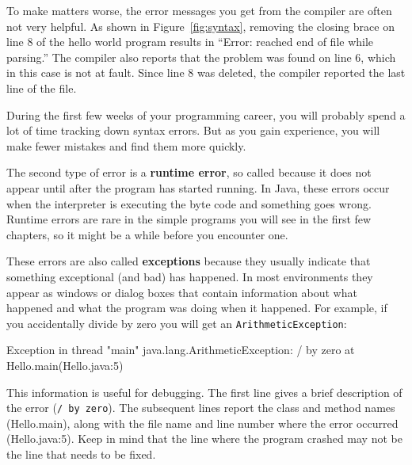 \documentclass[12pt]{book}
\makeatletter
\theoremstyle{exercise}
\newcommand{\java}[1]{\verb"#1"}
\renewcommand\subsection{\@startsection{subsection}{2}{\z@}%
    {-3.25ex\@plus -1ex \@minus -.2ex}%
    {0.3ex \@plus .2ex}%
    {\normalfont\large\bfseries}}
\newcommand{\java}[1]{\lstinline{#1}} %
\makeatother
\begin{document}
To make matters worse, the error messages you get from the compiler are often not very helpful.
As shown in Figure~\ref{fig:syntax}, removing the closing brace on line 8 of the hello world program results in ``Error: reached end of file while parsing.''
The compiler also reports that the problem was found on line 6, which in this case is not at fault.
Since line 8 was deleted, the compiler reported the last line of the file.

During the first few weeks of your programming career, you will probably spend a lot of time tracking down syntax errors.
But as you gain experience, you will make fewer mistakes and find them more quickly.



The second type of error is a {\bf runtime error}, so called because it does not appear until after the program has started running.
In Java, these errors occur when the interpreter is executing the byte code and something goes wrong.
Runtime errors are rare in the simple programs you will see in the first few chapters, so it might be a while before you encounter one.


These errors are also called {\bf exceptions} because they usually indicate that something exceptional (and bad) has happened.
In most environments they appear as windows or dialog boxes that contain information about what happened and what the program was doing when it happened.
For example, if you accidentally divide by zero you will get an \java{ArithmeticException}:

\begin{small}
\begin{stdout}
Exception in thread "main" java.lang.ArithmeticException: / by zero
    at Hello.main(Hello.java:5)
\end{stdout}
\end{small}

This information is useful for debugging.
The first line gives a brief description of the error (\java{/ by zero}).
The subsequent lines report the class and method names (Hello.main), along with the file name and line number where the error occurred (Hello.java:5).
Keep in mind that the line where the program crashed may not be the line that needs to be fixed.
\end{document}
